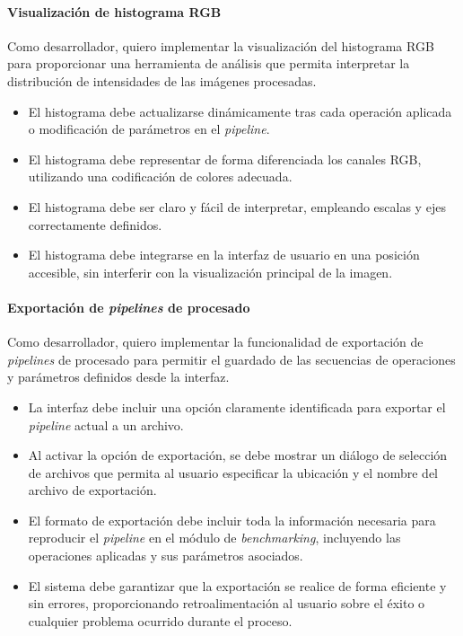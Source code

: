 \newpage

\paragraph{Visualización de histograma RGB} \label{hist:implementacion_histograma_rgb}
Como desarrollador, quiero implementar la visualización del histograma RGB para proporcionar una herramienta 
de análisis que permita interpretar la distribución de intensidades de las imágenes procesadas.

\begin{itemize}[noitemsep]
	\item El histograma debe actualizarse dinámicamente tras cada operación aplicada o modificación de parámetros en el \textit{pipeline}.
	\item El histograma debe representar de forma diferenciada los canales RGB, utilizando una codificación de colores adecuada.
	\item El histograma debe ser claro y fácil de interpretar, empleando escalas y ejes correctamente definidos.
	\item El histograma debe integrarse en la interfaz de usuario en una posición accesible, sin interferir con la visualización principal de la imagen.
\end{itemize}

\paragraph{Exportación de \textit{pipelines} de procesado} \label{hist:exportacion_pipelines_procesado}
Como desarrollador, quiero implementar la funcionalidad de exportación de \textit{pipelines}
de procesado para permitir el guardado de las secuencias de operaciones y parámetros definidos desde 
la interfaz.

\begin{itemize}[noitemsep]
	\item La interfaz debe incluir una opción claramente identificada para exportar el \textit{pipeline} actual a un archivo.
	\item Al activar la opción de exportación, se debe mostrar un diálogo de selección de archivos que permita al usuario especificar la ubicación y el nombre del archivo de exportación.
	\item El formato de exportación debe incluir toda la información necesaria para reproducir el \textit{pipeline} en el módulo de \textit{benchmarking}, incluyendo las operaciones aplicadas y sus parámetros asociados.
	\item El sistema debe garantizar que la exportación se realice de forma eficiente y sin errores, proporcionando retroalimentación al usuario sobre el éxito o cualquier problema ocurrido durante el proceso.
\end{itemize}

